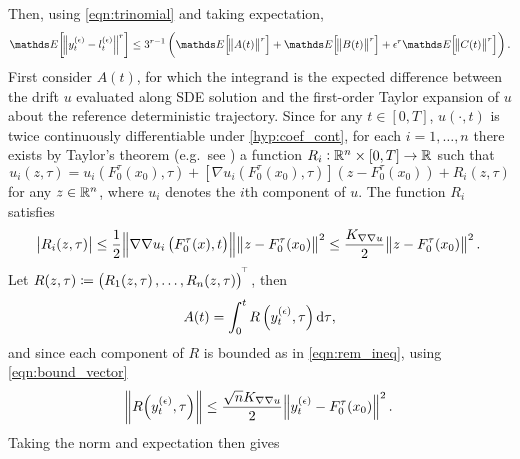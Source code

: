 Then, using \cref{eqn:trinomial} and taking expectation,
\begin{equation}
	\avg{\norm{y_t^{(\epsilon)} - l_t^{(\epsilon)}}^r} \leq 3^{r-1}\left(\avg{\norm{A(t)}^r} + \avg{\norm{B(t)}^r} + \epsilon^r\avg{\norm{C(t)}^r}\right) .
	\label{eqn:diff_decomp}
\end{equation}
First consider \(A(t)\), for which the integrand is the expected difference between the drift \(u\) evaluated along SDE solution and the first-order Taylor expansion of \(u\) about the reference deterministic trajectory.
Since for any \(t \in [0,T]\), \(u\left(\cdot, t\right)\) is twice continuously differentiable under \ref{hyp:coef_cont}, for each \(i = 1,\hdots,n\) there exists by Taylor's theorem (e.g.\ see \citet[Cor. A9.3.]{HubbardHubbard_2009_VectorCalculusLinear}) a function \(R_i: \mathbb{R}^n \times [0,T] \to \mathbb{R}\) such that
\begin{equation}
	u_i\!\left(z, \tau\right) = u_i\!\left(F_0^\tau\!\left(x_0\right), \tau\right) + \left[\nabla u_i\left(F_0^\tau\!\left(x_0\right), \tau\right)\right]\left(z - F_0^\tau\!\left(x_0\right)\right) + R_i\!\left(z, \tau\right)
	\label{eqn:taylor_expan}
\end{equation}
for any \(z \in \mathbb{R}^n\), where \(u_i\) denotes the \(i\)th component of \(u\).
The function \(R_i\) satisfies
\begin{equation}
	\abs{R_i(z, \tau)} \leq \frac12\norm{\nabla\nabla u_i\left(F_0^\tau(x), t\right)}\norm{z - F_0^\tau\!\left(x_0\right)}^2 \leq \frac{K_{\nabla\nabla u}}{2}\norm{z - F_0^\tau\!\left(x_0\right)}^2.
	\label{eqn:rem_ineq}
\end{equation}
Let \(R\!\left(z, \tau\right) \coloneqq \left( R_1\!\left(z, \tau\right), \hdots, R_n\!\left(z, \tau\right)\right)^{^{\!\top}}\), then
\[
	A(t) = \int_0^t{R\left(y_{t}^{(\epsilon)}, \tau\right)\dif\tau},
\]
and since each component of \(R\) is bounded as in \cref{eqn:rem_ineq}, using \cref{eqn:bound_vector}
\[
	\norm{R\!\left(y_t^{(\epsilon)}, \tau\right)} \leq \frac{\sqrt{n} K_{\nabla\nabla u}}{2}\norm{y_t^{(\epsilon)} - F_0^\tau\!\left(x_0\right)}^2.
\]
Taking the norm and expectation then gives
